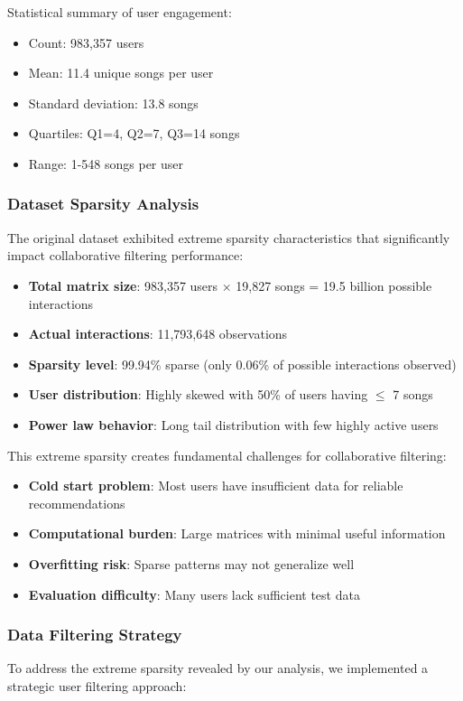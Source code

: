 \documentclass[12pt,a4paper]{article}
\begin{document}
Statistical summary of user engagement:
\begin{itemize}
    \item Count: 983,357 users
    \item Mean: 11.4 unique songs per user
    \item Standard deviation: 13.8 songs
    \item Quartiles: Q1=4, Q2=7, Q3=14 songs
    \item Range: 1-548 songs per user
\end{itemize}

\subsubsection{Dataset Sparsity Analysis}

The original dataset exhibited extreme sparsity characteristics that significantly impact collaborative filtering performance:

\begin{itemize}
    \item \textbf{Total matrix size}: 983,357 users × 19,827 songs = 19.5 billion possible interactions
    \item \textbf{Actual interactions}: 11,793,648 observations
    \item \textbf{Sparsity level}: 99.94\% sparse (only 0.06\% of possible interactions observed)
    \item \textbf{User distribution}: Highly skewed with 50\% of users having $\leq$ 7 songs
    \item \textbf{Power law behavior}: Long tail distribution with few highly active users
\end{itemize}

This extreme sparsity creates fundamental challenges for collaborative filtering:
\begin{itemize}
    \item \textbf{Cold start problem}: Most users have insufficient data for reliable recommendations
    \item \textbf{Computational burden}: Large matrices with minimal useful information
    \item \textbf{Overfitting risk}: Sparse patterns may not generalize well
    \item \textbf{Evaluation difficulty}: Many users lack sufficient test data
\end{itemize}

\subsubsection{Data Filtering Strategy}
To address the extreme sparsity revealed by our analysis, we implemented a strategic user filtering approach:
\end{document}
